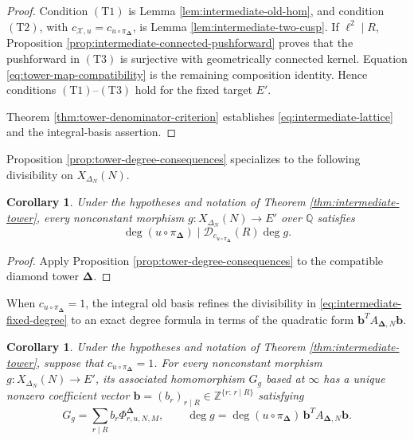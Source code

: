 \documentclass[12pt, letterpaper]{amsart}
\newtheorem{corollary}[theorem]{Corollary}
\theoremstyle{definition}
\theoremstyle{remark}
\newcommand{\Q}{\mathbb Q}
\newcommand{\Z}{\mathbb Z}
\numberwithin{equation}{section}
\begin{document}
\begin{proof}
Condition \hyperlink{tower-condition-T1}{\(\mathrm{(T1)}\)} is Lemma \ref{lem:intermediate-old-hom}, and
condition \hyperlink{tower-condition-T2}{\(\mathrm{(T2)}\)}, with
\(c_{\mathcal X,u}=c_{u\circ\pi_{\boldsymbol\Delta}}\), is Lemma
\ref{lem:intermediate-two-cusp}. If \(\ell^2\mid R\),
Proposition \ref{prop:intermediate-connected-pushforward} proves that the
pushforward in \hyperlink{tower-condition-T3}{\(\mathrm{(T3)}\)} is surjective with geometrically connected
kernel. Equation \eqref{eq:tower-map-compatibility} is the remaining
composition identity. Hence conditions \hyperlink{tower-condition-T1}{\(\mathrm{(T1)}\)}--\hyperlink{tower-condition-T3}{\(\mathrm{(T3)}\)}
hold for the fixed target \(E'\).

Theorem \ref{thm:tower-denominator-criterion} establishes
\eqref{eq:intermediate-lattice} and the integral-basis assertion.
\end{proof}

Proposition \ref{prop:tower-degree-consequences} specializes to the
following divisibility on \(X_{\Delta_N}(N)\).

\begin{corollary}\label{cor:intermediate-fixed-degree}
Under the hypotheses and notation of Theorem \ref{thm:intermediate-tower},
every nonconstant morphism \(g:X_{\Delta_N}(N)\to E'\) over \(\Q\) satisfies
\begin{equation}\label{eq:intermediate-fixed-degree}
        \deg(u\circ\pi_{\boldsymbol\Delta})
        \mid
        \mathcal D_{c_{u\circ\pi_{\boldsymbol\Delta}}}(R)\deg g.
\end{equation}
\end{corollary}

\begin{proof}
Apply Proposition \ref{prop:tower-degree-consequences} to the compatible
diamond tower \(\boldsymbol\Delta\).
\end{proof}

When \(c_{u\circ\pi_{\boldsymbol\Delta}}=1\), the integral old basis refines the
divisibility in \eqref{eq:intermediate-fixed-degree} to an exact degree formula
in terms of the quadratic form
\(\boldsymbol b^{T}A_{\boldsymbol\Delta,N}\boldsymbol b\).

\begin{corollary}\label{cor:intermediate-degree-form}
Under the hypotheses and notation of Theorem \ref{thm:intermediate-tower},
suppose that \(c_{u\circ\pi_{\boldsymbol\Delta}}=1\).
For every nonconstant morphism
\(g:X_{\Delta_N}(N)\to E'\), its associated homomorphism \(G_g\) based at
\(\infty\) has a unique nonzero coefficient vector
\(\boldsymbol b=(b_r)_{r\mid R}\in\Z^{\{r:\,r\mid R\}}\) satisfying
\[
        G_g=\sum_{r\mid R}b_r\Phi^{\boldsymbol\Delta}_{r,u,N,M},
        \qquad
        \deg g=\deg(u\circ\pi_{\boldsymbol\Delta})
        \,\boldsymbol b^{T}A_{\boldsymbol\Delta,N}\boldsymbol b.
\]
\end{corollary}
\end{document}
